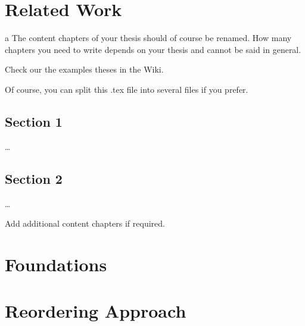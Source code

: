 
\chapter{Related Work}
\label{ch:RelatedWork}
a
The content chapters of your thesis should of course be renamed. How many chapters you need to write depends on your thesis and cannot be said in general. 

Check our the examples theses in the Wiki. 

Of course, you can split this .tex file into several files if you prefer. 


\section{Section 1}
\label{ch:Content1:sec:Section1}

\dots


\section{Section 2}
\label{ch:Content1:sec:Section2}

\dots

Add additional content chapters if required. 

\chapter{Foundations}
\label{ch:Foundations}

\chapter{Reordering Approach}
\label{ch:ReorderingApproach}
